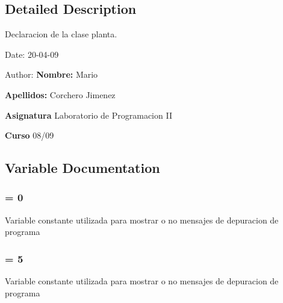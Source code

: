 \subsection{Detailed Description}
Declaracion de la clase planta. 

\begin{Desc}
\item[Date:]20-04-09 \end{Desc}
\begin{Desc}
\item[Author:]{\bf Nombre:} Mario \par
 {\bf Apellidos:} Corchero Jimenez \par
 {\bf Asignatura} Laboratorio de Programacion II \par
 {\bf Curso} 08/09 \end{Desc}


\subsection{Variable Documentation}
\subsubsection{ = 0}\label{planta_8h_145cac595903edc296d4a86e423d21f2}


Variable constante utilizada para mostrar o no mensajes de depuracion de programa 
\subsubsection{ = 5}\label{planta_8h_257accb2041f0acff27a81ca90809992}


Variable constante utilizada para mostrar o no mensajes de depuracion de programa 